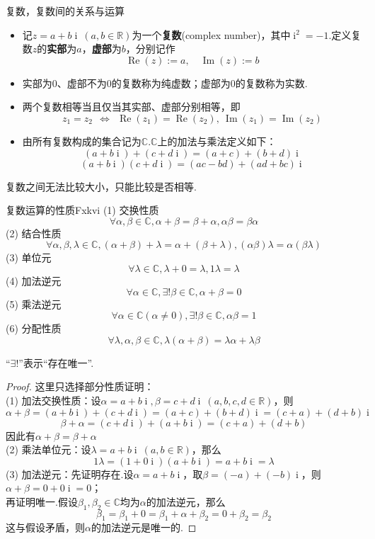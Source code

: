 \documentclass[lang=cn, zihao=5]{elegantbook}
\newcommand{\R}{\mathbb{R}}
\newcommand{\C}{\mathbb{C}}
\DeclareMathOperator{\ic}{i}
\DeclareMathOperator{\CRe}{Re}
\DeclareMathOperator{\CIm}{Im}
\begin{document}
\newpage
\begin{definition}{复数，复数间的关系与运算}
	\begin{itemize}
		\item 记$z=a+b\ic ~(a,b \in \R )$为一个\textbf{复数}(complex number)，其中$\ic ^2=-1$.定义复数$z$的\textbf{实部}为$a$，\textbf{虚部}为$b$，分别记作$$\CRe (z):=a,\quad \CIm (z):=b$$
		\item 实部为$0$、虚部不为$0$的复数称为纯虚数；虚部为$0$的复数称为实数.
		\item 两个复数相等当且仅当其实部、虚部分别相等，即$$z_1=z_2 ~~ \Leftrightarrow ~~ \CRe (z_1) = \CRe (z_2) ,~ \CIm (z_1) = \CIm (z_2)$$
		\item 由所有复数构成的集合记为$\C$.$\C$上的加法与乘法定义如下：
			$$(a+b\ic ) + (c+d\ic ) = (a+c) + (b+d)\ic $$
			$$(a+b\ic )(c+d\ic ) = (ac-bd) + (ad+bc)\ic $$
	\end{itemize}
\end{definition}
\begin{remark}
	复数之间无法比较大小，只能比较是否相等.
\end{remark}

\begin{proposition}{复数运算的性质}{Fxkvi}
	(1) 交换性质$$\forall \alpha , \beta \in \C , \alpha + \beta = \beta + \alpha , \alpha \beta = \beta \alpha$$
	(2) 结合性质$$\forall \alpha , \beta , \lambda \in \C , (\alpha + \beta) + \lambda = \alpha + (\beta + \lambda) , (\alpha \beta) \lambda = \alpha (\beta \lambda)$$
	(3) 单位元$$\forall \lambda \in \C , \lambda + 0 = \lambda , 1 \lambda = \lambda$$
	(4) 加法逆元$$\forall \alpha \in \C , \exists ! \beta \in \C , \alpha + \beta = 0$$
	(5) 乘法逆元$$\forall \alpha \in \C (\alpha \neq 0) , \exists ! \beta \in \C , \alpha \beta = 1$$
	(6) 分配性质$$\forall \lambda , \alpha , \beta \in \C , \lambda (\alpha + \beta) = \lambda \alpha + \lambda \beta$$
\end{proposition}
\begin{remark}
	“$\exists !$”表示“存在唯一”.
\end{remark}
\begin{proof}
	这里只选择部分性质证明： \\
	(1) 加法交换性质：设$\alpha = a+b\ic , \beta = c+d\ic ~(a,b,c,d \in \R )$，则
	$$\alpha + \beta = (a+b\ic ) + (c+d\ic ) = (a+c) + (b+d)\ic = (c+a) + (d+b)\ic$$
	$$\beta + \alpha = (c+d\ic ) + (a+b\ic ) = (c+a) + (d+b)$$
	因此有$\alpha + \beta = \beta + \alpha$ \\
	(2) 乘法单位元：设$\lambda = a+b\ic ~ (a,b \in \R )$，那么$$1 \lambda = (1+0\ic )(a+b\ic ) = a + b\ic = \lambda$$
	(3) 加法逆元：先证明存在.设$\alpha = a+b\ic $，取$\beta = (-a) + (-b)\ic $，则$\alpha + \beta = 0+0\ic = 0$；\\
	再证明唯一.假设$\beta _1, \beta _2 \in \C $均为$\alpha$的加法逆元，那么$$\beta _1 = \beta _1 + 0 = \beta _1 + \alpha + \beta _2 = 0 + \beta _2 = \beta _2$$
	这与假设矛盾，则$\alpha$的加法逆元是唯一的.
\end{proof}
\end{document}
